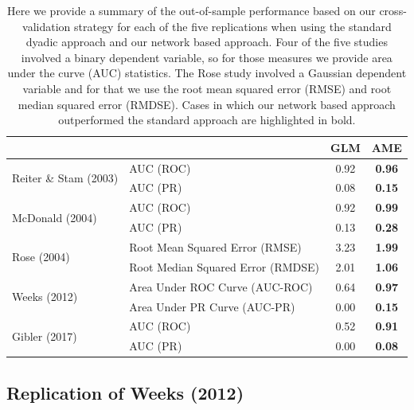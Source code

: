 \begin{table}[ht]
\centering
	\begin{tabular}{l|l cc}
	~ & ~ & GLM & AME \\
	\toprule
\multirow{2}{*}{Reiter \& Stam (2003)} & AUC (ROC) & 0.92 & \textbf{0.96} \\
		~ & AUC (PR) & 0.08 & \textbf{0.15} \\		\midrule
\multirow{2}{*}{McDonald (2004)} & AUC (ROC) & 0.92 & \textbf{0.99} \\
		~ & AUC (PR) & 0.13 & \textbf{0.28} \\		\midrule
\multirow{2}{*}{Rose (2004)} & Root Mean Squared Error (RMSE) & 3.23 & \textbf{1.99} \\
		~ & Root Median Squared Error (RMDSE) & 2.01 & \textbf{1.06} \\	\midrule
\multirow{2}{*}{Weeks (2012)} & Area Under ROC Curve (AUC-ROC) & 0.64 & \textbf{0.97} \\
		~ & Area Under PR Curve (AUC-PR) & 0.00 & \textbf{0.15} \\		\midrule
\multirow{2}{*}{Gibler (2017)} & AUC (ROC) & 0.52 & \textbf{0.91} \\
		~ & AUC (PR) & 0.00 & \textbf{0.08} \\			\bottomrule
	\end{tabular}
	\caption{Here we provide a summary of the out-of-sample performance based on our cross-validation strategy for each of the five replications when using the standard dyadic approach and our network based approach. Four of the five studies involved a binary dependent variable, so for those measures we provide area under the curve (AUC) statistics. The Rose study involved a Gaussian dependent variable and for that we use the root mean squared error (RMSE) and root median squared error (RMDSE). Cases in which our network based approach outperformed the standard approach are highlighted in bold.}
	\label{tab:modelPerfSumm}
\end{table}
\FloatBarrier

\subsection{Replication of Weeks (2012)}


